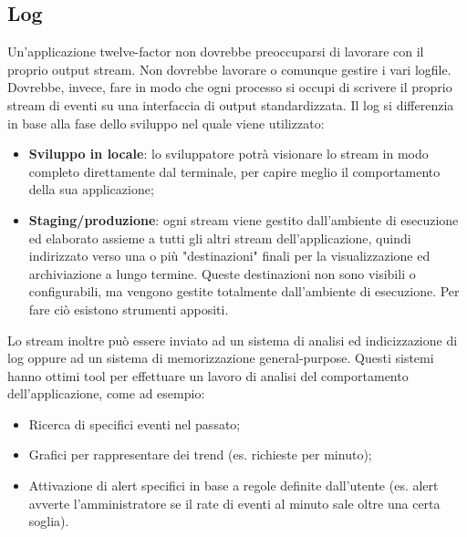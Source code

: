 \documentclass[PianoDiQualifica.tex]{subfiles}
\begin{document}
\subsection{Log}
Un'applicazione twelve-factor non dovrebbe preoccuparsi di lavorare con il proprio output stream. Non dovrebbe lavorare o comunque gestire i vari logfile. Dovrebbe, invece, fare in modo che ogni processo si occupi di scrivere il proprio stream di eventi su una interfaccia di output standardizzata.
Il log si differenzia in base alla fase dello sviluppo nel quale viene utilizzato:
\begin{itemize}
\item \textbf{Sviluppo in locale}: lo sviluppatore potrà visionare lo stream in modo completo direttamente dal terminale, per capire meglio il comportamento della sua applicazione;
\item \textbf{Staging/produzione}: ogni stream viene gestito dall'ambiente di esecuzione ed elaborato assieme a tutti gli altri stream dell'applicazione, quindi indirizzato verso una o più "destinazioni" finali per la visualizzazione ed archiviazione a lungo termine. Queste destinazioni non sono visibili o configurabili, ma vengono gestite totalmente dall'ambiente di esecuzione. Per fare ciò esistono strumenti appositi.
\end{itemize}
Lo stream inoltre può essere inviato ad un sistema di analisi ed indicizzazione di log oppure ad un sistema di memorizzazione general-purpose. Questi sistemi hanno ottimi tool per effettuare un lavoro di analisi del comportamento dell'applicazione, come ad esempio:
\begin{itemize}
\item Ricerca di specifici eventi nel passato;
\item Grafici per rappresentare dei trend (es. richieste per minuto);
\item Attivazione di alert specifici in base a regole definite dall'utente (es. alert avverte l'amministratore se il rate di eventi al minuto sale oltre una certa soglia).
\end{itemize}
\end{document}
